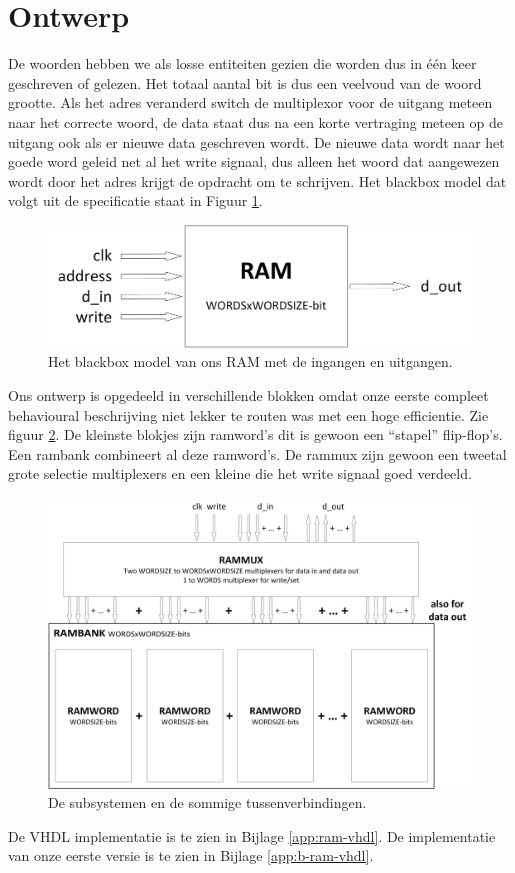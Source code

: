 \documentclass{scrartcl}  %
\begin{document}
\section{Ontwerp}
De woorden hebben we als losse entiteiten gezien die worden dus in één keer geschreven of gelezen.
Het totaal aantal bit is dus een veelvoud van de woord grootte.
Als het adres veranderd switch de multiplexor voor de uitgang meteen naar het correcte woord, de data staat dus na een korte vertraging meteen op de uitgang ook als er nieuwe data geschreven wordt.
De nieuwe data wordt naar het goede word geleid net al het write signaal, dus alleen het woord dat aangewezen wordt door het adres krijgt de opdracht om te schrijven.
Het blackbox model dat volgt uit de specificatie staat in Figuur \ref{fig:blackbox-ram}.
\begin{figure}[H]
\centering
		\includegraphics[width=\textwidth]{resource/blackbox-ram}
		\caption{Het blackbox model van ons RAM met de ingangen en uitgangen.}
		\label{fig:blackbox-ram}
\end{figure}
Ons ontwerp is opgedeeld in verschillende blokken omdat onze eerste compleet behavioural beschrijving niet lekker te routen was met een hoge efficientie. Zie figuur \ref{fig:subsystems-ram}.
De kleinste blokjes zijn ramword’s dit is gewoon een “stapel” flip-flop’s.
Een rambank combineert al deze ramword’s.
De rammux zijn gewoon een tweetal grote selectie multiplexers en een kleine die het write signaal goed verdeeld.
\begin{figure}[H]
\centering
		\includegraphics[width=\textwidth]{resource/subsystems-ram}
		\caption{De subsystemen en de sommige tussenverbindingen.}
		\label{fig:subsystems-ram}
\end{figure}
De VHDL implementatie is te zien in Bijlage \ref{app:ram-vhdl}. De implementatie van onze eerste versie is te zien in Bijlage \ref{app:b-ram-vhdl}.
\end{document}
